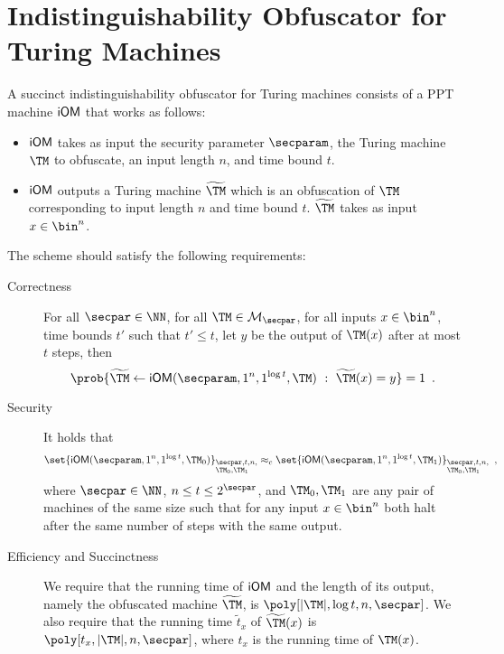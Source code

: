 
\section{Indistinguishability Obfuscator for Turing Machines}

\begin{definition}
		A succinct indistinguishability obfuscator for Turing machines  consists of a PPT machine $\mathsf{iOM}$ that works as follows:
		\begin{itemize}
			\item $\mathsf{iOM}$ takes as input the security parameter $\secparam$, the Turing machine $\TM$ to obfuscate, an input length $n$, and time bound $t$.
			\item $\mathsf{iOM}$ outputs a Turing machine $\widetilde{\TM}$ which is an obfuscation of $\TM$ corresponding to input length $n$ and time bound $t$. $\widetilde{\TM}$ takes as input $x \in \bin^n$.

		\end{itemize}
		The scheme should satisfy the following requirements:
		\begin{description}
			\item[Correctness] For all $\secpar \in \NN$, for all $\TM \in \mathcal{M}_\secpar$, for all inputs $x \in \bin^n$, time bounds $t'$ such that $t' \le t$, let $y$ be the output of $\TM(x)$ after at most $t$ steps, then
			\[
				\prob{\widetilde{\TM} \leftarrow \iOM(\secparam,1^n,1^{\log t},\TM)~:~\widetilde{\TM}(x)=y} = 1\enspace.
			\]
			\item[Security] It holds that
			\[
						\set{\iOM(\secparam,1^n,1^{\log t},\TM_0)}_{\begin{subarray}{l}\secpar,t,n,\\ \TM_0,\TM_1\end{subarray}} \approx_c
							\set{\iOM(\secparam,1^n,1^{\log t},\TM_1)}_{\begin{subarray}{l}\secpar,t,n,\\ \TM_0,\TM_1\end{subarray}} \enspace,
			\]
			where $\secpar\in \NN$, $n\leq t\leq 2^{\secpar}$, and $\TM_0, \TM_1$ are any pair of machines of the same size such that for any input $x\in\bin^n$ both halt after the same number of steps with the same output.


			\item[Efficiency and Succinctness] We require that the running time of $\mathsf{iOM}$ and the length of its output, namely the obfuscated machine $\widetilde{\TM}$, is $\poly[|\TM|,\log t,n,\secpar]$. We also require that the running time $\tilde t_x$ of $\widetilde{\TM}(x)$ is $\poly[t_x,|\TM|, n,\secpar]$, where $t_x$ is the running time of $\TM(x)$.
		\end{description}
	\end{definition}

